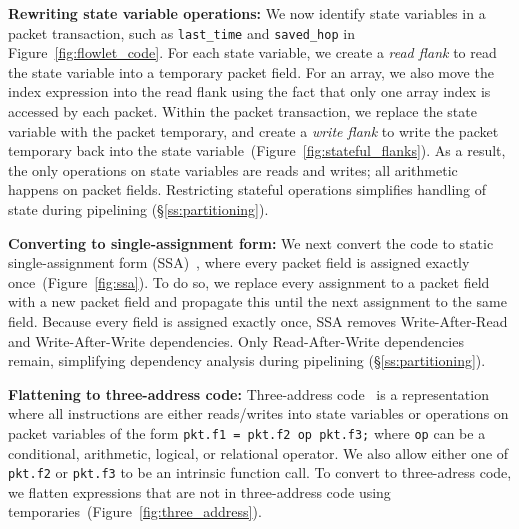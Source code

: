 \textbf{Rewriting state variable operations: }We now identify state variables
in a packet transaction, such as \texttt{last\_time} and \texttt{saved\_hop} in
Figure~\ref{fig:flowlet_code}.  For each state variable, we create a
\textit{read flank} to read the state variable into a temporary packet field.
For an array, we also move the index expression into the read flank using the
fact that only one array index is accessed by each packet.  Within the packet
transaction, we replace the state variable with the packet temporary, and
create a \textit{write flank} to write the packet temporary back into the state
variable~(Figure~\ref{fig:stateful_flanks}). As a result, the only operations
on state variables are reads and writes; all arithmetic happens on packet
fields. Restricting stateful operations simplifies handling of state during
pipelining (\S\ref{ss:partitioning}).

\textbf{Converting to single-assignment form: }We next convert the code to
static single-assignment form (SSA)~\cite{ssa}, where every packet field is
assigned exactly once~(Figure~\ref{fig:ssa}). To do so, we replace every
assignment to a packet field with a new packet field and propagate this until
the next assignment to the same field.  Because every field is assigned exactly
once, SSA removes Write-After-Read and Write-After-Write dependencies.  Only
Read-After-Write dependencies remain, simplifying dependency analysis during
pipelining (\S\ref{ss:partitioning}).

\textbf{Flattening to three-address code: } Three-address code~\cite{tac} is a
representation where all instructions are either reads/writes into state
variables or operations on packet variables of the form \texttt{pkt.f1 = pkt.f2
op pkt.f3;} where \texttt{op} can be a conditional, arithmetic, logical, or
relational operator.  We also allow either one of {\tt pkt.f2} or {\tt pkt.f3}
to be an intrinsic function call.  To convert to three-adress code, we flatten
expressions that are not in three-address code using
temporaries~(Figure~\ref{fig:three_address}).


